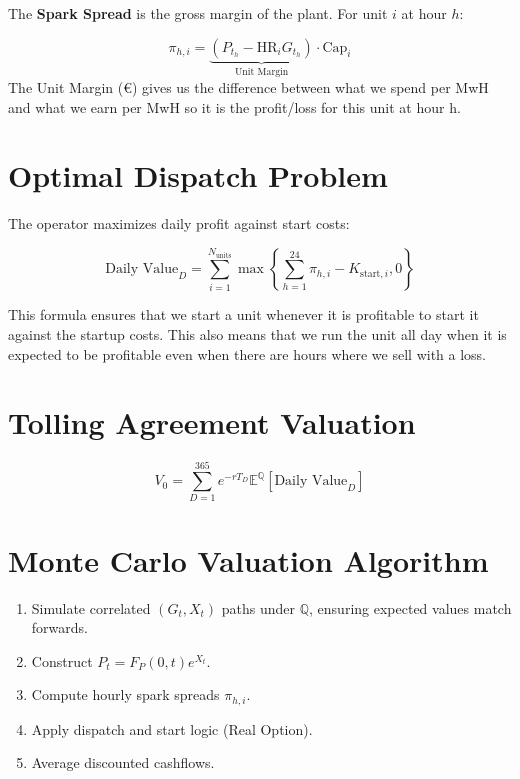 \documentclass{article}
\begin{document}
The \textbf{Spark Spread} is the gross margin of the plant. For unit $i$ at hour $h$:

\begin{equation}
\pi_{h,i}
=
\underbrace{\left(
P_{t_h}
-
\mathrm{HR}_i G_{t_h}
\right)}_{\text{Unit Margin}}
\cdot \mathrm{Cap}_i
\end{equation}
The Unit Margin (€) gives us the difference between what we spend per MwH and what we earn per MwH so it is the profit/loss for this unit at hour h.
\section{Optimal Dispatch Problem}

The operator maximizes daily profit against start costs:

\begin{equation}
\text{Daily Value}_D =
\sum_{i=1}^{N_{\mathrm{units}}}
\max
\left\{
\sum_{h=1}^{24}\pi_{h,i}
-
K_{\mathrm{start},i}, 0
\right\}
\end{equation}

This formula ensures that we start a unit whenever it is profitable to start it against the startup costs.
This also means that we run the unit all day when it is expected to be profitable even when there are hours where we sell with a loss.
\section{Tolling Agreement Valuation}

\begin{equation}
V_0 =
\sum_{D=1}^{365}
e^{-rT_D}
\mathbb E^{\mathbb Q}\left[\text{Daily Value}_D\right]
\end{equation}

\section{Monte Carlo Valuation Algorithm}

\begin{tcolorbox}
\begin{enumerate}
    \item Simulate correlated $(G_t,X_t)$ paths under $\mathbb Q$, ensuring expected values match forwards.
    \item Construct $P_t = F_P(0,t)e^{X_t}$.
    \item Compute hourly spark spreads $\pi_{h,i}$.
    \item Apply dispatch and start logic (Real Option).
    \item Average discounted cashflows.
\end{enumerate}
\end{tcolorbox}
\end{document}
